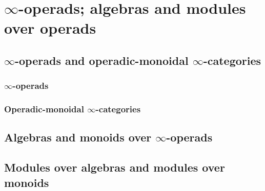 \section{\texorpdfstring{$\infty$}{}-operads; algebras and modules over operads} \label{section: algebras_and_modules_over_operads}
    \subsection{\texorpdfstring{$\infty$}{}-operads and operadic-monoidal \texorpdfstring{$\infty$}{}-categories} \label{subsection: operads}
        \subsubsection{\texorpdfstring{$\infty$}{}-operads}
        
        \subsubsection{Operadic-monoidal \texorpdfstring{$\infty$}{}-categories}
    
    \subsection{Algebras and monoids over \texorpdfstring{$\infty$}{}-operads}
    
    \subsection{Modules over algebras and modules over monoids}